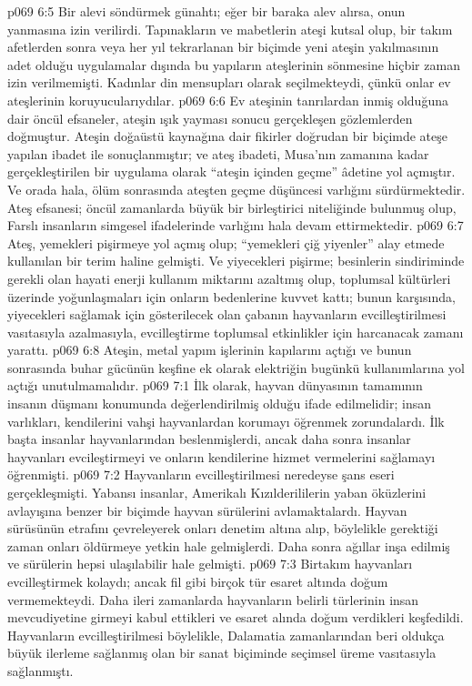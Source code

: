 \vs p069 6:5 Bir alevi söndürmek günahtı; eğer bir baraka alev alırsa, onun yanmasına izin verilirdi. Tapınakların ve mabetlerin ateşi kutsal olup, bir takım afetlerden sonra veya her yıl tekrarlanan bir biçimde yeni ateşin yakılmasının adet olduğu uygulamalar dışında bu yapıların ateşlerinin sönmesine hiçbir zaman izin verilmemişti. Kadınlar din mensupları olarak seçilmekteydi, çünkü onlar ev ateşlerinin koruyucularıydılar.
\vs p069 6:6 Ev ateşinin tanrılardan inmiş olduğuna dair öncül efsaneler, ateşin ışık yayması sonucu gerçekleşen gözlemlerden doğmuştur. Ateşin doğaüstü kaynağına dair fikirler doğrudan bir biçimde ateşe yapılan ibadet ile sonuçlanmıştır; ve ateş ibadeti, Musa’nın zamanına kadar gerçekleştirilen bir uygulama olarak “ateşin içinden geçme” âdetine yol açmıştır. Ve orada hala, ölüm sonrasında ateşten geçme düşüncesi varlığını sürdürmektedir. Ateş efsanesi; öncül zamanlarda büyük bir birleştirici niteliğinde bulunmuş olup, Farslı insanların simgesel ifadelerinde varlığını hala devam ettirmektedir.
\vs p069 6:7 Ateş, yemekleri pişirmeye yol açmış olup; “yemekleri çiğ yiyenler” alay etmede kullanılan bir terim haline gelmişti. Ve yiyecekleri pişirme; besinlerin sindiriminde gerekli olan hayati enerji kullanım miktarını azaltmış olup, toplumsal kültürleri üzerinde yoğunlaşmaları için onların bedenlerine kuvvet kattı; bunun karşısında, yiyecekleri sağlamak için gösterilecek olan çabanın hayvanların evcilleştirilmesi vasıtasıyla azalmasıyla, evcilleştirme toplumsal etkinlikler için harcanacak zamanı yarattı.
\vs p069 6:8 Ateşin, metal yapım işlerinin kapılarını açtığı ve bunun sonrasında buhar gücünün keşfine ek olarak elektriğin bugünkü kullanımlarına yol açtığı unutulmamalıdır.
\vs p069 7:1 İlk olarak, hayvan dünyasının tamamının insanın düşmanı konumunda değerlendirilmiş olduğu ifade edilmelidir; insan varlıkları, kendilerini vahşi hayvanlardan korumayı öğrenmek zorundalardı. İlk başta insanlar hayvanlarından beslenmişlerdi, ancak daha sonra insanlar hayvanları evcileştirmeyi ve onların kendilerine hizmet vermelerini sağlamayı öğrenmişti.
\vs p069 7:2 Hayvanların evcilleştirilmesi neredeyse şans eseri gerçekleşmişti. Yabansı insanlar, Amerikalı Kızılderililerin yaban öküzlerini avlayışına benzer bir biçimde hayvan sürülerini avlamaktalardı. Hayvan sürüsünün etrafını çevreleyerek onları denetim altına alıp, böylelikle gerektiği zaman onları öldürmeye yetkin hale gelmişlerdi. Daha sonra ağıllar inşa edilmiş ve sürülerin hepsi ulaşılabilir hale gelmişti.
\vs p069 7:3 Birtakım hayvanları evcilleştirmek kolaydı; ancak fil gibi birçok tür esaret altında doğum vermemekteydi. Daha ileri zamanlarda hayvanların belirli türlerinin insan mevcudiyetine girmeyi kabul ettikleri ve esaret alında doğum verdikleri keşfedildi. Hayvanların evcilleştirilmesi böylelikle, Dalamatia zamanlarından beri oldukça büyük ilerleme sağlanmış olan bir sanat biçiminde seçimsel üreme vasıtasıyla sağlanmıştı.
